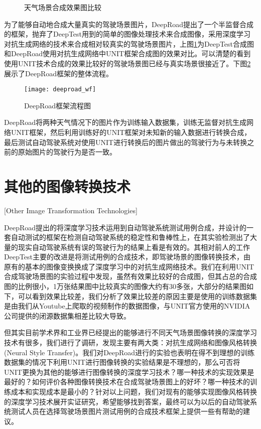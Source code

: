 \begin{figure}[h]
    \centering
    \label{deeptest_effect}
    \caption{天气场景合成效果图比较}
\end{figure}

为了能够自动地合成大量真实的驾驶场景图片，DeepRoad提出了一个半监督合成的框架，抛弃了DeepTest用到的简单的图像处理技术来合成图像，采用深度学习对抗生成网络的技术来合成相对较真实的驾驶场景图片，上图\ref{deeptest_effect}为DeepTest合成图和DeepRoad使用对抗生成网络中UNIT\cite{UNIT}框架合成图的效果对比。可以清楚的看到使用UNIT技术合成的效果比较好的驾驶场景图已经与真实场景很接近了。下图\ref{deeproad_wf}展示了DeepRoad框架的整体流程。 

\begin{figure}[h]
    \centering
    \texttt{[image: deeproad\_wf]}
    \caption{DeepRoad框架流程图\cite{DeepRoad}}
    \label{deeproad_wf}
\end{figure}

DeepRoad将两种天气情况下的图片作为训练输入数据集，训练无监督对抗生成网络UNIT\cite{UNIT}框架，然后利用训练好的UNIT框架对未知新的输入数据进行转换合成，最后测试自动驾驶系统对使用UNIT进行转换后的图片做出的驾驶行为与未转换之前的原始图片的驾驶行为是否一致。

\section{其他的图像转换技术}[Other Image Transformation Technologies]

DeepRoad提出的将深度学习技术运用到自动驾驶系统测试用例合成，并设计的一套自动测试的框架在检测自动驾驶系统的稳定性和鲁棒性上，在其实验检测出了大量的现实自动驾驶系统有误的驾驶行为的结果\cite{DeepRoad}上看是有效的。其相对前人的工作DeepTest主要的改进是将测试用例的合成技术，即驾驶场景的图像转换技术，由原有的基本的图像变换换成了深度学习中的对抗生成网络技术。我们在利用UNIT合成驾驶场景图的实验过程中发现，虽然有效果比较好的合成图，但其占总的合成图的比例很小，1万张结果图中比较真实的图像大约有30多张，大部分的结果图如下，可以看到效果比较差，我们分析了效果比较差的原因主要是使用的训练数据集是由我们从Youtube上爬取的视频制作的数据图像，与UNIT官方使用的NVIDIA公司提供的闭源数据集相差比较大导致。

但其实目前学术界和工业界已经提出的能够进行不同天气场景图像转换的深度学习技术有很多，我们进行了调研，发现主要有两大类：对抗生成网络和图像风格转换(Neural Style Transfer)。我们对DeepRoad进行的实验也表明在得不到理想的训练数据集的情况下利用UNIT进行图像转换的实验结果是不理想的，那么可否将UNIT更换为其他的能够进行图像转换的深度学习技术？哪一种技术的实现效果是最好的？如何评价各种图像转换技术在合成驾驶场景图上的好坏？哪一种技术的训练成本和实现成本是最小的？针对以上问题，我们对现有的能够实现图像风格转换的深度学习技术展开实证研究，希望能够找到答案，最终可以为以后的自动驾驶系统测试人员在选择驾驶场景图片测试用例的合成技术框架上提供一些有帮助的建议。

